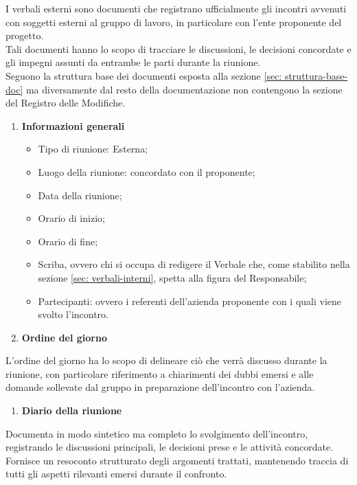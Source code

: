 \vspace{0.7em}
\label{sec:verbali-esterni}
I verbali esterni sono documenti che registrano ufficialmente gli incontri avvenuti con soggetti esterni al gruppo di lavoro, in particolare con l'ente proponente del progetto.\\
Tali documenti hanno lo scopo di tracciare le discussioni, le decisioni concordate e gli impegni assunti da entrambe le parti durante la riunione.\\
Seguono la struttura base dei documenti esposta alla sezione \ref{sec: struttura-base-doc} ma diversamente dal resto della documentazione non contengono la sezione del Registro delle Modifiche.
    \begin{enumerate}[label=\arabic*., itemsep=0pt, parsep=1pt, leftmargin=*]
        \item \textbf{Informazioni generali}
        \begin{itemize}[label=--, itemsep=0pt, parsep=1pt, leftmargin=1.5em]
            \item Tipo di riunione: Esterna;
            \item Luogo della riunione: concordato con il proponente;
            \item Data della riunione;
            \item Orario di inizio; 
            \item Orario di fine;
            \item Scriba, ovvero chi si occupa di redigere il Verbale che, come stabilito nella sezione \ref{sec: verbali-interni}, spetta alla figura del Responsabile;
            \item Partecipanti: ovvero i referenti dell'azienda proponente con i quali viene svolto l'incontro. 
        \end{itemize}
        \item \textbf{Ordine del giorno} 
    \end{enumerate}
    \vspace{-0.5em}
    L'ordine del giorno ha lo scopo di delineare ciò che verrà discusso durante la riunione, con particolare riferimento a chiarimenti dei dubbi emersi e alle domande sollevate dal gruppo in preparazione dell'incontro con l'azienda.

    \begin{enumerate}[resume*, itemsep=0pt, parsep=1pt, leftmargin=*, label=\arabic*.]
        \item \textbf{Diario della riunione}
    \end{enumerate}
    \vspace{-0.5em}
    Documenta in modo sintetico ma completo lo svolgimento dell'incontro, registrando le discussioni principali, le decisioni prese e le attività concordate. Fornisce un resoconto strutturato degli argomenti trattati, mantenendo traccia di tutti gli aspetti rilevanti emersi durante il confronto.

